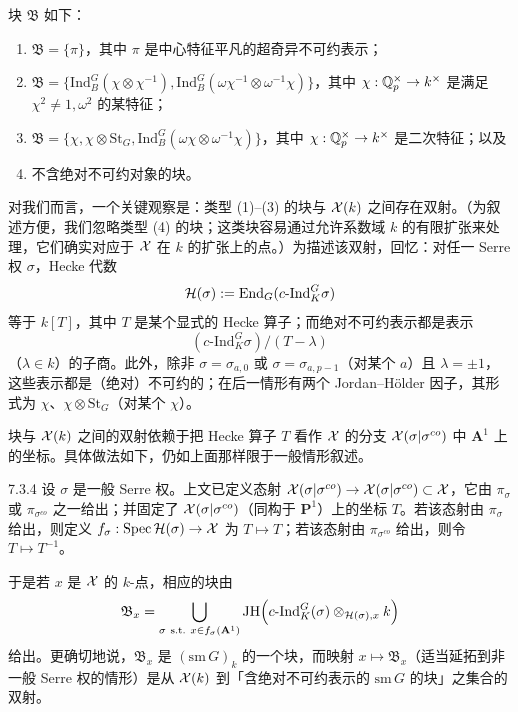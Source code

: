 块 $\mathfrak B$ 如下：
\begin{enumerate}[label=(\arabic*),leftmargin=2.4em,itemsep=0.15em]
\item $\mathfrak B=\{\pi\}$，其中 $\pi$ 是中心特征平凡的超奇异不可约表示；
\item $\mathfrak B=\{\mathrm{Ind}_B^G(\chi\otimes\chi^{-1}),\mathrm{Ind}_B^G(\omega\chi^{-1}\otimes\omega^{-1}\chi)\}$，其中 $\chi:\mathbb{Q}_p^\times\to k^\times$ 是满足 $\chi^2\neq1,\omega^2$ 的某特征；
\item $\mathfrak B=\{\chi,\chi\otimes\mathrm{St}_G,\mathrm{Ind}_B^G(\omega\chi\otimes\omega^{-1}\chi)\}$，其中 $\chi:\mathbb{Q}_p^\times\to k^\times$ 是二次特征；以及
\item 不含绝对不可约对象的块。
\end{enumerate}

对我们而言，一个关键观察是：类型 (1)--(3) 的块与 $\mathcal{X}(k)$ 之间存在双射。（为叙述方便，我们忽略类型 (4) 的块；这类块容易通过允许系数域 $k$ 的有限扩张来处理，它们确实对应于 $\mathcal{X}$ 在 $k$ 的扩张上的点。）为描述该双射，回忆：对任一 Serre 权 $\sigma$，Hecke 代数
\[
\mathcal H(\sigma):=\operatorname{End}_G(c\text{-Ind}_K^G\sigma)
\]
等于 $k[T]$，其中 $T$ 是某个显式的 Hecke 算子；而绝对不可约表示都是表示
\[
(c\text{-Ind}_K^G\sigma)/(T-\lambda)
\]
（$\lambda\in k$）的子商。此外，除非 $\sigma=\sigma_{a,0}$ 或 $\sigma=\sigma_{a,p-1}$（对某个 $a$）且 $\lambda=\pm1$，这些表示都是（绝对）不可约的；在后一情形有两个 Jordan--Hölder 因子，其形式为 $\chi$、$\chi\otimes\mathrm{St}_G$（对某个 $\chi$）。

块与 $\mathcal{X}(k)$ 之间的双射依赖于把 Hecke 算子 $T$ 看作 $\mathcal{X}$ 的分支 $\mathcal{X}(\sigma|\sigma^{co})$ 中 $\mathbf A^1$ 上的坐标。具体做法如下，仍如上面那样限于一般情形叙述。

\begin{defn}{7.3.4}\label{thm:a4-7-3-4}
设 $\sigma$ 是一般 Serre 权。上文已定义态射 $\mathcal{X}(\sigma|\sigma^{co})\to\mathcal{X}(\sigma|\sigma^{co})\subset\mathcal{X}$，它由 $\pi_\sigma$ 或 $\pi_{\sigma^{co}}$ 之一给出；并固定了 $\mathcal{X}(\sigma|\sigma^{co})$（同构于 $\mathbf P^1$）上的坐标 $T$。若该态射由 $\pi_\sigma$ 给出，则定义 $f_\sigma:\operatorname{Spec}\mathcal H(\sigma)\to\mathcal{X}$ 为 $T\mapsto T$；若该态射由 $\pi_{\sigma^{co}}$ 给出，则令 $T\mapsto T^{-1}$。
\end{defn}

于是若 $x$ 是 $\mathcal{X}$ 的 $k$-点，相应的块由
\[
\mathfrak B_x=\bigcup_{\sigma\ \text{s.t.}\ x\in f_\sigma(\mathbf A^1)}\mathrm{JH}\Bigl(c\text{-Ind}_K^G(\sigma)\otimes_{\mathcal H(\sigma),x}k\Bigr)
\]
给出。更确切地说，$\mathfrak B_x$ 是 $(\mathrm{sm}\,G)_k$ 的一个块，而映射 $x\mapsto\mathfrak B_x$（适当延拓到非一般 Serre 权的情形）是从 $\mathcal{X}(k)$ 到「含绝对不可约表示的 $\mathrm{sm}\,G$ 的块」之集合的双射。


